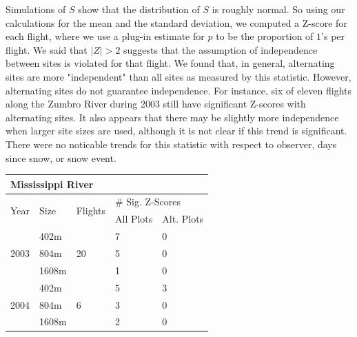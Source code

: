 \documentclass[12pt]{article}
\begin{document}
    Simulations of \(S\) show that the distribution of \(S\) is roughly normal.
    So using our calculations for the mean and the standard deviation, we
    computed a Z-score for each flight, where we use a plug-in estimate for
    \(p\) to be the proportion of \(1\)'s per flight. We said that \(|Z| > 2\) suggests that the assumption of
    independence between sites is violated for that flight. We found that, in
    general, alternating sites are more "independent" than all sites as measured
    by this statistic. However, alternating sites do not guarantee independence.
    For instance, six of eleven flights along the Zumbro River during 2003 still
    have significant Z-scores with alternating sites. It also appears that there 
	may be slightly more independence when larger site sizes are used, although it is
not clear if this trend is significant.  There 
	were no noticable trends for this statistic with respect to observer, days 
	since snow, or snow event.

    \begin{center}
    \begin{tabular}{|l|l|l|l|l|}
        \hline
        \multicolumn{5}{|l|}{\textbf{Mississippi River}} \\
        \hline
        \multirow{2}{*}{Year} & \multirow{2}{*}{Size} & \multirow{2}{*}{Flights}
        & \multicolumn{2}{|l|}{\# Sig. Z-Scores} \\
        \cline{4-5}
        & & & All Plots & Alt. Plots \\
        \hline
        \multirow{3}{*}{2003} & 402m & \multirow{3}{*}{20} & 7 & 0 \\
        \cline{2-2} \cline{4-5}
        & 804m & & 5 & 0 \\
        \cline{2-2} \cline{4-5}
        & 1608m & & 1 & 0 \\
        \hline
        \multirow{3}{*}{2004} & 402m & \multirow{3}{*}{6} & 5 & 3 \\
        \cline{2-2} \cline{4-5}
        & 804m & & 3 & 0 \\
        \cline{2-2} \cline{4-5}
        & 1608m & & 2 & 0 \\
        \hline
    \end{tabular}
    \end{center}
\end{document}

